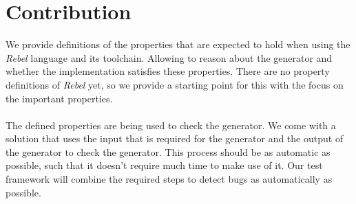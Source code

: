 \section{Contribution}
We provide definitions of the properties that are expected to hold when using the \textit{Rebel} language and its toolchain. Allowing to reason about the generator and whether the implementation satisfies these properties. There are no property definitions of \textit{Rebel} yet, so we provide a starting point for this with the focus on the important properties.\\
\\
The defined properties are being used to check the generator. We come with a solution that uses the input that is required for the generator and the output of the generator to check the generator. This process should be as automatic as possible, such that it doesn't require much time to make use of it. Our test framework will combine the required steps to detect bugs as automatically as possible.\\
\\
